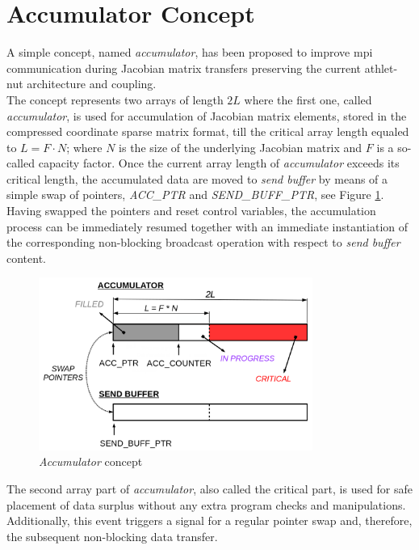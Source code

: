 \section{Accumulator Concept}
\label{sec:accumulator-approach}



A simple concept, named \textit{accumulator}, has been proposed to improve \acrshort{mpi} communication during Jacobian matrix transfers preserving the current \acrshort{athlet}-\acrshort{nut} architecture and coupling.\\


The concept represents two arrays of length $2L$ where the first one, called \textit{accumulator}, is used for accumulation of Jacobian matrix elements, stored in the compressed coordinate sparse matrix format, till the critical array length equaled to $L = F \cdot N$; where $N$ is the size of the underlying Jacobian matrix and $F$ is a so-called capacity factor. Once the current array length of \textit{accumulator} exceeds its critical length, the accumulated data are moved to \textit{send buffer} by means of a simple swap of pointers, \textit{ACC\_PTR} and \textit{SEND\_BUFF\_PTR}, see Figure \ref{fig:accumulator-concept}. Having swapped the pointers and reset control variables, the accumulation process can be immediately resumed together with an immediate instantiation of the corresponding non-blocking broadcast operation with respect to \textit{send buffer} content.\\


\begin{figure}[htpb]
  \centering
  \includegraphics[width=0.8\textwidth]{figures/chapter-3/accumulator-concept.png}
  \caption{\textit{Accumulator} concept} \label{fig:accumulator-concept}
\end{figure}


The second array part of \textit{accumulator}, also called the critical part, is used for safe placement of data surplus without any extra program checks and manipulations. Additionally, this event triggers a signal for a regular pointer swap and, therefore, the subsequent non-blocking data transfer.\\


